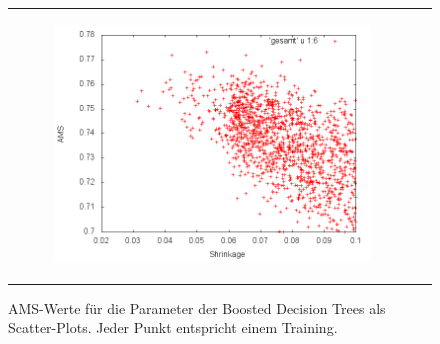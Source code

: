 \begin{figure}[!t]
\begin{tabular}[b]{cc}
  	  \begin{subfigure}[b]{0.5\linewidth}
	   	\includegraphics[width=\linewidth]{sections/parameter_optimization_bdt/Shrinkage.png}
 		\caption[]{}
		\label{fig:bdt_Shrinkage}
  	  \end{subfigure} &
  \end{tabular}
  \caption[AMS-Werte für die Parameter der Boosted Decision Trees]{AMS-Werte für die Parameter der Boosted Decision Trees als Scatter-Plots. Jeder Punkt entspricht einem Training.}
  \label{fig:AMS-distribution-plots}
\end{figure}